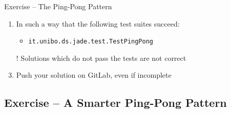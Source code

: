 \documentclass{beamer}\mode<presentation>{\usetheme{AMSCesenaPurpleAndGold}}
\begin{document}
\begin{frame}[c,allowframebreaks]{Exercise \currentExercise{} -- The Ping-Pong Pattern}
\begin{enumerate}
		\medskip
		
		\item In such a way that the following test suites succeed:
		\begin{itemize}
			\item \texttt{it.unibo.ds.jade.test.\alert{TestPingPong}}
		\end{itemize}
		
		\medskip
		
		\item[!] Solutions which do not pass the tests are not correct
		
		\medskip
		
		\item Push your solution on GitLab, \alert{even if incomplete}
		
	\end{enumerate}
	
\end{frame}

\startExercise

\subsection{Exercise \currentExercise{} -- A Smarter Ping-Pong Pattern}
\end{document}
